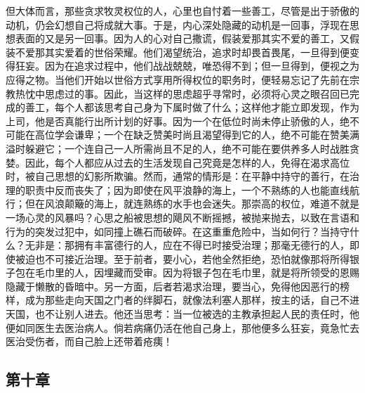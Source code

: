 但大体而言，那些贪求牧灵权位的人，心里也自忖着一些善工，尽管是出于骄傲的动机，仍会幻想自己将成就大事。于是，内心深处隐藏的动机是一回事，浮现在思想表面的又是另一回事。因为人的心对自己撒谎，假装爱那其实不爱的善工，又假装不爱那其实爱着的世俗荣耀。他们渴望统治，追求时却畏首畏尾，一旦得到便变得狂妄。因为在追求过程中，他们战战兢兢，唯恐得不到；但一旦得到，便视之为应得之物。当他们开始以世俗方式享用所得权位的职务时，便轻易忘记了先前在宗教热忱中思虑过的事。因此，当这样的思虑超乎寻常时，必须将心灵之眼召回已完成的善工，每个人都该思考自己身为下属时做了什么；这样他才能立即发现，作为上司，他是否真能行出所计划的好事。因为一个在低位时尚未停止骄傲的人，绝不可能在高位学会谦卑；一个在缺乏赞美时尚且渴望得到它的人，绝不可能在赞美满溢时躲避它；一个连自己一人所需尚且不足的人，绝不可能在要供养多人时战胜贪婪。因此，每个人都应从过去的生活发现自己究竟是怎样的人，免得在渴求高位时，被自己思想的幻影所欺骗。然而，通常的情形是：在平静中持守的善行，在治理的职责中反而丧失了；因为即使在风平浪静的海上，一个不熟练的人也能直线航行；但在风浪颠簸的海上，就连熟练的水手也会迷失。那崇高的权位，难道不就是一场心灵的风暴吗？心思之船被思想的飓风不断摇撼，被抛来抛去，以致在言语和行为的突发过犯中，如同撞上礁石而破碎。在这重重危险中，当如何行？当持守什么？无非是：那拥有丰富德行的人，应在不得已时接受治理；那毫无德行的人，即使被迫也不可接近治理。至于前者，要小心，若他全然拒绝，恐怕就像那将所得银子包在毛巾里的人，因埋藏而受审。因为将银子包在毛巾里，就是将所领受的恩赐隐藏于懒散的昏暗中。另一方面，后者若渴求治理，要当心，免得他因恶行的榜样，成为那些走向天国之门者的绊脚石，就像法利塞人那样，按主的话，自己不进天国，也不让别人进去。他还当思考：当一位被选的主教承担起人民的责任时，他便如同医生去医治病人。倘若病痛仍活在他自己身上，那他便多么狂妄，竟急忙去医治受伤者，而自己脸上还带着疮痍！\par


\subsection{第十章}

\par

